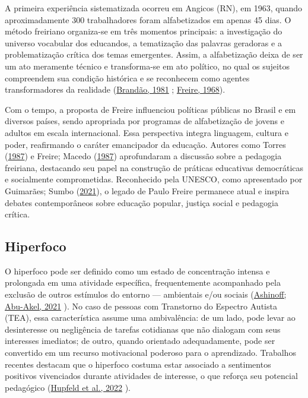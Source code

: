 \documentclass[
  12pt,
  a4paper,
]{article}
\begin{document}
A primeira experiência sistematizada ocorreu em Angicos (RN), em 1963,
quando aproximadamente 300 trabalhadores foram alfabetizados em apenas
45 dias. O método freiriano organiza-se em três momentos principais: a
investigação do universo vocabular dos educandos, a tematização das
palavras geradoras e a problematização crítica dos temas emergentes.
Assim, a alfabetização deixa de ser um ato meramente técnico e
transforma-se em ato político, no qual os sujeitos compreendem sua
condição histórica e se reconhecem como agentes transformadores da
realidade (\protect\hyperlink{ref-brandao1981}{Brandão, 1981} ;
\protect\hyperlink{ref-freire1968}{Freire, 1968}).

Com o tempo, a proposta de Freire influenciou políticas públicas no
Brasil e em diversos países, sendo apropriada por programas de
alfabetização de jovens e adultos em escala internacional. Essa
perspectiva integra linguagem, cultura e poder, reafirmando o caráter
emancipador da educação. Autores como Torres
(\protect\hyperlink{ref-torres1987}{1987}) e Freire; Macedo
(\protect\hyperlink{ref-macedo1987}{1987}) aprofundaram a discussão
sobre a pedagogia freiriana, destacando seu papel na construção de
práticas educativas democráticas e socialmente comprometidas.
Reconhecido pela UNESCO, como apresentado por Guimarães; Sumbo
(\protect\hyperlink{ref-guimaraes2021}{2021}), o legado de Paulo Freire
permanece atual e inspira debates contemporâneos sobre educação popular,
justiça social e pedagogia crítica.

\hypertarget{hiperfoco}{%
\subsection{Hiperfoco}\label{hiperfoco}}

O hiperfoco pode ser definido como um estado de concentração intensa e
prolongada em uma atividade específica, frequentemente acompanhado pela
exclusão de outros estímulos do entorno --- ambientais e/ou sociais
(\protect\hyperlink{ref-ashinoff2021}{Ashinoff; Abu-Akel, 2021} ). No
caso de pessoas com Transtorno do Espectro Autista (TEA), essa
característica assume uma ambivalência: de um lado, pode levar ao
desinteresse ou negligência de tarefas cotidianas que não dialogam com
seus interesses imediatos; de outro, quando orientado adequadamente,
pode ser convertido em um recurso motivacional poderoso para o
aprendizado. Trabalhos recentes destacam que o hiperfoco costuma estar
associado a sentimentos positivos vivenciados durante atividades de
interesse, o que reforça seu potencial pedagógico
(\protect\hyperlink{ref-hupfeld2022}{Hupfeld et al., 2022} ).
\end{document}

